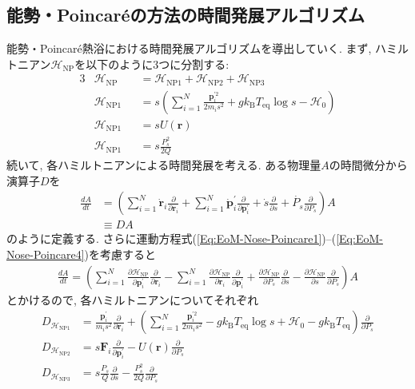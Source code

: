 \subsection{能勢・Poincar\'{e}の方法の時間発展アルゴリズム}
能勢・Poincar\'{e}熱浴における時間発展アルゴリズムを導出していく.
まず, ハミルトニアン$\mathcal{H}_{\mathrm{NP}}$を以下のように3つに分割する:
\begin{alignat}{3}
  &\mathcal{H}_{\mathrm{NP}}
  &&=
  \mathcal{H}_{\mathrm{NP1}} +
  \mathcal{H}_{\mathrm{NP2}} +
  \mathcal{H}_{\mathrm{NP3}}
  \\
  &\mathcal{H}_{\mathrm{NP1}}
  &&=
  s
  \left(
    \sum_{i=1}^{N}
    \frac{\bm{p}_{i}^{\prime 2}}{2m_{i}s^{2}}
    +
    g k_{\mathrm{B}} T_{\mathrm{eq}} \log s
    - \mathcal{H}_{0}
  \right)
  \\
  &\mathcal{H}_{\mathrm{NP1}}
  &&=
  s U(\bm{r})
  \\
  &\mathcal{H}_{\mathrm{NP1}}
  &&=
  s \frac{P_{s}^{2}}{2Q}
\end{alignat}
続いて, 各ハミルトニアンによる時間発展を考える. ある物理量$A$の時間微分から演算子$D$を
\begin{align}
  \frac{dA}{dt}
  &=
  \left(
    \sum_{i=1}^{N} \dot{\bm{r}}_{i}
    \frac{\partial}{\partial \bm{r}_{i}}
    +
    \sum_{i=1}^{N} \dot{\bm{p}}_{i}^{\prime}
    \frac{\partial}{\partial \bm{p}_{i}^{\prime}}
    +
    \dot{s}
    \frac{\partial}{\partial s}
    +
    \dot{P_{s}}
    \frac{\partial}{\partial P_{s}}
  \right)
  A
  \\
  &\equiv
  DA
\end{align}
のように定義する. さらに運動方程式(\ref{Eq:EoM-Nose-Poincare1})--(\ref{Eq:EoM-Nose-Poincare4})を考慮すると
\begin{align}
  \frac{dA}{dt}
  =
  \left(
    \sum_{i=1}^{N}
    \frac{\partial \mathcal{H}_{\mathrm{NP}}}{\partial \bm{p}_{i}^{\prime}}
    \frac{\partial}{\partial \bm{r}_{i}}
    -
    \sum_{i=1}^{N}
    \frac{\partial \mathcal{H}_{\mathrm{NP}}}{\partial \bm{r}_{i}}
    \frac{\partial}{\partial \bm{p}_{i}^{\prime}}
    +
    \frac{\partial \mathcal{H}_{\mathrm{NP}}}{\partial P_{s}}
    \frac{\partial}{\partial s}
    -
    \frac{\partial \mathcal{H}_{\mathrm{NP}}}{\partial s}
    \frac{\partial}{\partial P_{s}}
  \right)
  A
\end{align}
とかけるので, 各ハミルトニアンについてそれぞれ
\begin{align}
  D_{\mathcal{H}_{\mathrm{NP1}}}
  &=
  \frac{\bm{p}_{i}^{\prime}}{m_{i}s^{2}}
  \frac{\partial}{\partial \bm{r}_{i}}
  +
  \left(
    \sum_{i=1}^{N}
    \frac{\bm{p}_{i}^{\prime 2}}{2m_{i}s^{2}}
    -
    g k_{\mathrm{B}} T_{\mathrm{eq}} \log s
    +
    \mathcal{H}_{0}
    -
    g k_{\mathrm{B}} T_{\mathrm{eq}}
  \right)
  \frac{\partial}{\partial P_{s}}
  \\
  D_{\mathcal{H}_{\mathrm{NP2}}}
  &=
  s \bm{F}_{i} \frac{\partial}{\partial \bm{p}_{i}^{\prime}}
  -
  U(\bm{r}) \frac{\partial}{\partial P_{s}}
  \\
  D_{\mathcal{H}_{\mathrm{NP3}}}
  &=
  s \frac{P_{s}}{Q} \frac{\partial}{\partial s}
  -
  \frac{P_{s}^{2}}{2Q} \frac{\partial}{\partial P_{s}}
\end{align}
